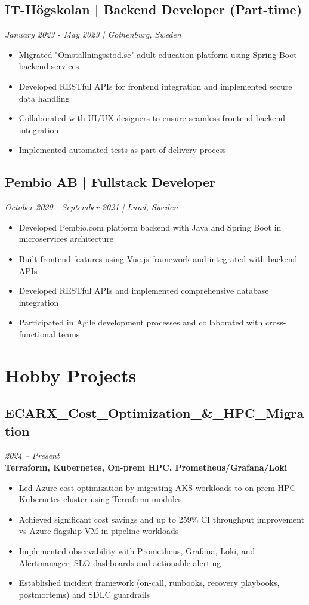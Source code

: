 \documentclass[11pt,a4paper]{article}
\begin{document}
\subsection*{IT-Högskolan | Backend Developer (Part-time)}
\textit{January 2023 - May 2023 | Gothenburg, Sweden}
\begin{itemize}[noitemsep]
\item Migrated "Omstallningsstod.se" adult education platform using Spring Boot backend services
\item Developed RESTful APIs for frontend integration and implemented secure data handling
\item Collaborated with UI/UX designers to ensure seamless frontend-backend integration
\item Implemented automated tests as part of delivery process
\end{itemize}

\subsection*{Pembio AB | Fullstack Developer}
\textit{October 2020 - September 2021 | Lund, Sweden}
\begin{itemize}[noitemsep]
\item Developed Pembio.com platform backend with Java and Spring Boot in microservices architecture
\item Built frontend features using Vue.js framework and integrated with backend APIs
\item Developed RESTful APIs and implemented comprehensive database integration
\item Participated in Agile development processes and collaborated with cross-functional teams
\end{itemize}



\section*{Hobby Projects}

\subsection{ECARX\_Cost\_Optimization\_\&\_HPC\_Migration}
\textit{2024 -- Present} \\
\textbf{Terraform, Kubernetes, On-prem HPC, Prometheus/Grafana/Loki}
\begin{itemize}
\item Led Azure cost optimization by migrating AKS workloads to on-prem HPC Kubernetes cluster using Terraform modules
\item Achieved significant cost savings and up to 259\% CI throughput improvement vs Azure flagship VM in pipeline workloads
\item Implemented observability with Prometheus, Grafana, Loki, and Alertmanager; SLO dashboards and actionable alerting
\item Established incident framework (on-call, runbooks, recovery playbooks, postmortems) and SDLC guardrails
\end{itemize}
\end{document}
